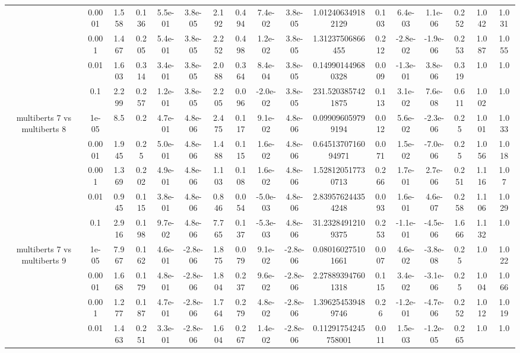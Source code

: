 \begin{tabular}{|c|c|c|c|c|c|c|c|c|c|c|c|c|c|c|c|c|}
 & 0.0001 & 1.558 & 0.136 & 5.5e-01 & 3.8e-05 & 2.192 & 0.494 & 7.4e-02 & 3.8e-05 & 1.012406349182129 & 0.103 & 6.4e-03 & 1.1e-06 & 0.252 & 1.042 & 1.031 \\
 & 0.001 & 1.467 & 0.205 & 5.4e-01 & 3.8e-05 & 2.252 & 0.498 & 1.2e-02 & 3.8e-05 & 1.31237506866455 & 0.212 & -2.8e-02 & -1.9e-06 & 0.253 & 1.087 & 1.055 \\
 & 0.01 & 1.603 & 0.314 & 3.4e-01 & 3.8e-05 & 2.088 & 0.364 & 8.4e-04 & 3.8e-05 & 0.149901449680328 & 0.009 & -1.3e-01 & 3.8e-06 & 0.319 & 1.0 & 1.0 \\
 & 0.1 & 2.299 & 0.257 & 1.2e-01 & 3.8e-05 & 2.205 & 0.096 & -2.0e-02 & 3.8e-05 & 231.5203857421875 & 0.113 & 3.1e-02 & 7.6e-08 & 0.611 & 1.002 & 1.0 \\
\hline
\multirow{5}{*}{multiberts 7 vs multiberts 8} & 1e-05 & 8.5 & 0.2 & 4.7e-01 & 4.8e-06 & 2.475 & 0.117 & 9.1e-02 & 4.8e-06 & 0.099096059799194 & 0.012 & 5.6e-02 & -2.3e-06 & 0.25 & 1.001 & 1.033 \\
 & 0.0001 & 1.945 & 0.25 & 5.0e-01 & 4.8e-06 & 1.488 & 0.115 & 1.6e-02 & 4.8e-06 & 0.6451370716094971 & 0.071 & 1.5e-02 & -7.0e-06 & 0.25 & 1.056 & 1.018 \\
 & 0.001 & 1.369 & 0.202 & 4.9e-01 & 4.8e-06 & 1.103 & 0.108 & 1.6e-02 & 4.8e-06 & 1.528120517730713 & 0.266 & 1.7e-01 & 2.7e-06 & 0.251 & 1.116 & 1.07 \\
 & 0.01 & 0.945 & 0.115 & 3.8e-01 & 4.8e-06 & 0.846 & 0.054 & -5.0e-03 & 4.8e-06 & 2.839576244354248 & 0.093 & 1.6e-01 & 4.6e-07 & 0.258 & 1.106 & 1.029 \\
 & 0.1 & 2.916 & 0.198 & 9.7e-02 & 4.8e-06 & 7.765 & 0.137 & -5.3e-03 & 4.8e-06 & 31.23284912109375 & 0.253 & -1.1e-01 & -4.5e-06 & 1.666 & 1.132 & 1.0 \\
\hline
\multirow{5}{*}{multiberts 7 vs multiberts 9} & 1e-05 & 7.967 & 0.162 & 4.6e-01 & -2.8e-06 & 1.875 & 0.079 & 9.1e-02 & -2.8e-06 & 0.080160275101661 & 0.007 & 4.6e-02 & -3.8e-08 & 0.25 & 1.0 & 1.022 \\
 & 0.0001 & 1.668 & 0.179 & 4.8e-01 & -2.8e-06 & 1.804 & 0.237 & 9.6e-02 & -2.8e-06 & 2.278893947601318 & 0.115 & 3.4e-02 & -3.1e-06 & 0.25 & 1.004 & 1.066 \\
 & 0.001 & 1.277 & 0.187 & 4.7e-01 & -2.8e-06 & 1.764 & 0.279 & 4.8e-02 & -2.8e-06 & 1.396254539489746 & 0.26 & -1.2e-01 & -4.7e-06 & 0.252 & 1.012 & 1.019 \\
 & 0.01 & 1.463 & 0.251 & 3.3e-01 & -2.8e-06 & 1.604 & 0.267 & 1.4e-02 & -2.8e-06 & 0.11291754245758001 & 0.011 & 1.5e-03 & -1.2e-05 & 0.265 & 1.0 & 1.0 \\

\end{tabular}
